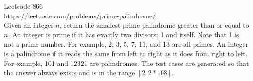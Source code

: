   Leetcode 866 \\
  \url{https://leetcode.com/problems/prime-palindrome/}\\
  Given an integer $n$, return the smallest prime palindrome greater than or
  equal to $n$.
  An integer is prime if it has exactly two divisors: 1 and itself.
  Note that 1 is not a prime number.
  For example, 2, 3, 5, 7, 11, and 13 are all primes.
  An integer is a palindrome if it reads the same from left to right
  as it does from right to left.
  For example, 101 and 12321 are palindromes.
  The test cases are generated so that the answer always exists and is
  in the range $[2, 2 * 108]$.
